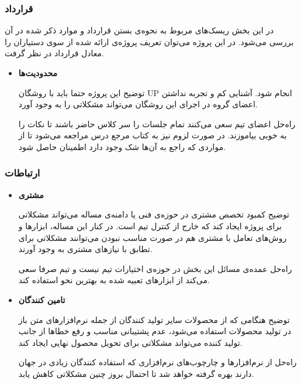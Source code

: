 \subsubsection{قرارداد}

در این بخش ریسک‌های مربوط به نحوه‌ی بستن قرارداد و موارد ذکر شده در آن بررسی می‌شود.
در این پروژه می‌توان تعریف پروژه‌ی ارائه شده از سوی دستیاران را معادل قرارداد در نظر گرفت.

\begin{itemize}
	
	\item 
	\textbf{محدودیت‌ها}

	توضیح \hspace*{1cm} 
این پروژه حتما باید با روشگان UP انجام شود.
آشنایی کم و تجربه نداشتن اعضای گروه در اجرای این روشگان می‌تواند مشکلاتی را به وجود آورد.
	
	راه‌حل \hspace*{1cm} 
اعضای تیم سعی می‌کنند تمام جلسات را سر کلاس حاضر باشند تا نکات را به خوبی بیاموزند.
در صورت لزوم نیز به کتاب مرجع درس مراجعه می‌شود تا از مواردی که راجع به آن‌ها شک وجود دارد اطمینان حاصل شود.
	
\end{itemize}

\subsubsection{ارتباطات}

\begin{itemize}
	
	\item 
	\textbf{مشتری}

	توضیح \hspace*{1cm} 
کمبود تخصص مشتری در حوزه‌ی فنی یا دامنه‌ی مساله می‌تواند مشکلاتی برای پروژه ایجاد کند که خارج از کنترل تیم است.
در کنار این مساله، ابزارها و روش‌های تعامل با مشتری هم در صورت مناسب نبودن می‌توانند مشکلاتی برای تطابق با نیازهای مشتری به وجود آورند.
	
	راه‌حل \hspace*{1cm} 
عمده‌ی مسائل این بخش در حوزه‌ی اختیارات تیم نیست و تیم صرفا سعی می‌کند از ابزارهای تعبیه شده به بهترین نحو استفاده کند.

	\item 
	\textbf{تامین کنندگان}

	توضیح \hspace*{1cm} 
هنگامی که از محصولات سایر تولید کنندگان از جمله نرم‌افزارهای متن باز در تولید محصولات استفاده می‌شود، عدم پشتیبانی مناسب و رفع خطاها از جانب تولید کننده می‌تواند مشکلاتی برای تحویل محصول نهایی ایجاد کند.

	راه‌حل \hspace*{1cm} 
از نرم‌افزارها و چارچوب‌های نرم‌افزاری که استفاده کنندگان زیادی در جهان دارند بهره گرفته خواهد شد تا احتمال بروز چنین مشکلاتی کاهش یابد.
	
\end{itemize}

